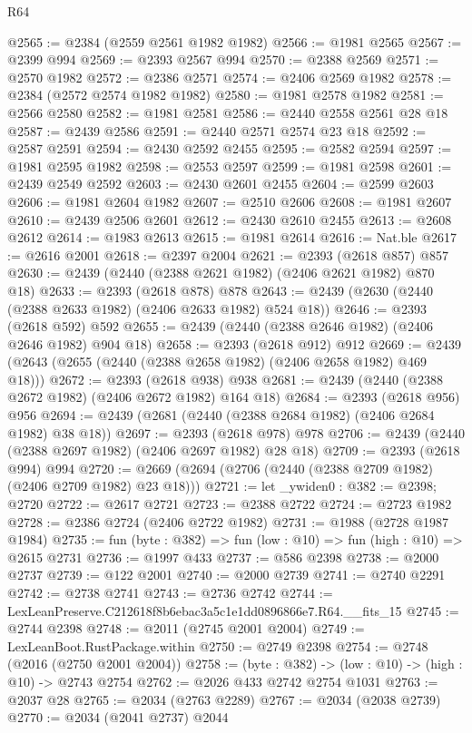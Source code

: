 \begin{lexlean}{R64}
\begin{coremodule}
@2565 := @2384 (@2559 @2561 @1982 @1982)
@2566 := @1981 @2565
@2567 := @2399 @994
@2569 := @2393 @2567 @994
@2570 := @2388 @2569
@2571 := @2570 @1982
@2572 := @2386 @2571
@2574 := @2406 @2569 @1982
@2578 := @2384 (@2572 @2574 @1982 @1982)
@2580 := @1981 @2578 @1982
@2581 := @2566 @2580
@2582 := @1981 @2581
@2586 := @2440 @2558 @2561 @28 @18
@2587 := @2439 @2586
@2591 := @2440 @2571 @2574 @23 @18
@2592 := @2587 @2591
@2594 := @2430 @2592 @2455
@2595 := @2582 @2594
@2597 := @1981 @2595 @1982
@2598 := @2553 @2597
@2599 := @1981 @2598
@2601 := @2439 @2549 @2592
@2603 := @2430 @2601 @2455
@2604 := @2599 @2603
@2606 := @1981 @2604 @1982
@2607 := @2510 @2606
@2608 := @1981 @2607
@2610 := @2439 @2506 @2601
@2612 := @2430 @2610 @2455
@2613 := @2608 @2612
@2614 := @1983 @2613
@2615 := @1981 @2614
@2616 := Nat.ble
@2617 := @2616 @2001
@2618 := @2397 @2004
@2621 := @2393 (@2618 @857) @857
@2630 := @2439 (@2440 (@2388 @2621 @1982) (@2406 @2621 @1982) @870 @18)
@2633 := @2393 (@2618 @878) @878
@2643 := @2439 (@2630 (@2440 (@2388 @2633 @1982) (@2406 @2633 @1982) @524 @18))
@2646 := @2393 (@2618 @592) @592
@2655 := @2439 (@2440 (@2388 @2646 @1982) (@2406 @2646 @1982) @904 @18)
@2658 := @2393 (@2618 @912) @912
@2669 := @2439 (@2643 (@2655 (@2440 (@2388 @2658 @1982) (@2406 @2658 @1982) @469 @18)))
@2672 := @2393 (@2618 @938) @938
@2681 := @2439 (@2440 (@2388 @2672 @1982) (@2406 @2672 @1982) @164 @18)
@2684 := @2393 (@2618 @956) @956
@2694 := @2439 (@2681 (@2440 (@2388 @2684 @1982) (@2406 @2684 @1982) @38 @18))
@2697 := @2393 (@2618 @978) @978
@2706 := @2439 (@2440 (@2388 @2697 @1982) (@2406 @2697 @1982) @28 @18)
@2709 := @2393 (@2618 @994) @994
@2720 := @2669 (@2694 (@2706 (@2440 (@2388 @2709 @1982) (@2406 @2709 @1982) @23 @18)))
@2721 := let _ywiden0 : @382 := @2398; @2720
@2722 := @2617 @2721
@2723 := @2388 @2722
@2724 := @2723 @1982
@2728 := @2386 @2724 (@2406 @2722 @1982)
@2731 := @1988 (@2728 @1987 @1984)
@2735 := fun (byte : @382) => fun (low : @10) => fun (high : @10) => @2615 @2731
@2736 := @1997 @433
@2737 := @586 @2398
@2738 := @2000 @2737
@2739 := @122 @2001
@2740 := @2000 @2739
@2741 := @2740 @2291
@2742 := @2738 @2741
@2743 := @2736 @2742
@2744 := LexLeanPreserve.C212618f8b6ebac3a5c1e1dd0896866e7.R64.__fits_15
@2745 := @2744 @2398
@2748 := @2011 (@2745 @2001 @2004)
@2749 := LexLeanBoot.RustPackage.within
@2750 := @2749 @2398
@2754 := @2748 (@2016 (@2750 @2001 @2004))
@2758 := (byte : @382) -> (low : @10) -> (high : @10) -> @2743 @2754
@2762 := @2026 @433 @2742 @2754 @1031
@2763 := @2037 @28
@2765 := @2034 (@2763 @2289)
@2767 := @2034 (@2038 @2739)
@2770 := @2034 (@2041 @2737) @2044

\end{coremodule}
\end{lexlean}
